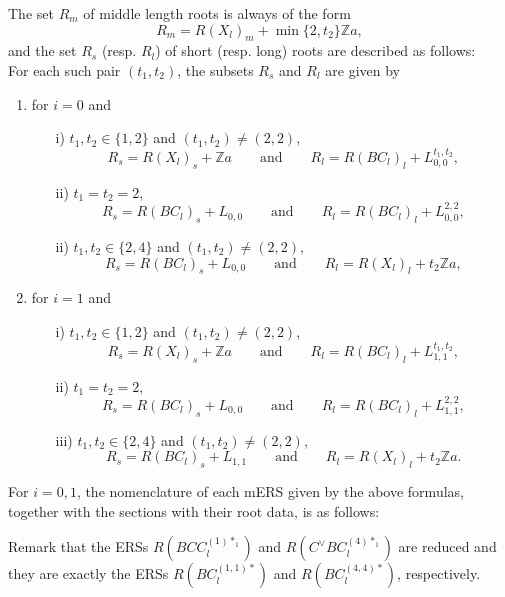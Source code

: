 \documentclass[11pt]{amsart}
\newcommand{\Z}{\mathbb{Z}}
\begin{document}
The set $R_m$ of middle length roots is always of the form
\[ R_m=R(X_l)_m+\min\{2,t_2\}\Z a, \]
and the set $R_s$ (resp. $R_l$) of short (resp. long) roots are described as follows: \\
\vskip 0.2in
 \hskip 0.1in 
For each such pair $(t_1,t_2)$, the subsets $R_s$ and $R_l$  are given by
\begin{enumerate}
\item for $i=0$ and
\begin{enumerate}
\item[i)] $t_1, t_2 \in \{1,2\}$ and $(t_1, t_2) \neq (2,2)$, 
\[ R_s=R(X_l)_s+\Z a \qquad  \text{and} \qquad R_l=R(BC_l)_l+L_{0,0}^{t_1,t_2}, \]
\item[ii)] $t_1=t_2=2$, 
\[ R_s=R(BC_l)_s+L_{0,0} \qquad \text{and} \qquad R_l=R(BC_l)_l+L_{0,0}^{2,2}, \]
\item[ii)] $t_1,t_2 \in \{2,4\}$ and $(t_1, t_2) \neq (2,2)$, 
\[ R_s=R(BC_l)_s+L_{0,0} \qquad \text{and} \qquad R_l=R(X_l)_l+t_2\Z a,\]
\end{enumerate}
\item for $i=1$ and 
\begin{enumerate}
\item[i)] $t_1, t_2 \in \{1,2\}$ and $(t_1, t_2) \neq (2,2)$, 
\[ R_s=R(X_l)_s+\Z a \qquad \text{and} \qquad R_l=R(BC_l)_l+L_{1,1}^{t_1,t_2}, \]
\item[ii)] $t_1=t_2=2$,
\[ R_s=R(BC_l)_s+L_{0,0} \qquad \text{and} \qquad R_l=R(BC_l)_l+L_{1,1}^{2,2}, \]
\item[iii)] $t_1,t_2 \in \{2,4\}$ and $(t_1, t_2) \neq (2,2)$, 
\[ R_s=R(BC_l)_s+L_{1,1} \qquad \text{and} \qquad R_l=R(X_l)_l+t_2\Z a. \]
\end{enumerate}
\end{enumerate}
For $i=0,1$, the nomenclature of each mERS given by the above formulas, together with the sections with their root data, is as follows:
{\small
\begin{center}
\end{center}}
Remark that the ERSs
$R(BCC_l^{(1)\ast_1})$ and $R(C^\vee BC_l^{(4)\ast_1})$ are reduced and they are exactly the ERSs $R(BC_l^{(1,1)\ast})$ and $R(BC_l^{(4,4)\ast})$, respectively. 
\vskip 0.2in
\end{document}
